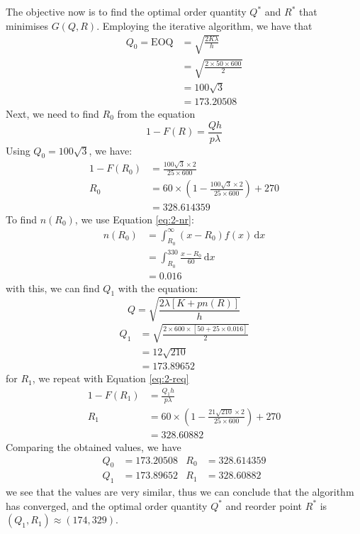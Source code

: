 \documentclass[12pt]{article}
\begin{document}
\noindent The objective now is to find the optimal order quantity $Q^{*}$ and $R^{*}$ that minimises $G(Q,R)$. Employing the iterative algorithm, we have that \begin{align*}
    Q_{0} = \text{EOQ} &= \sqrt{ \frac{2K\lambda}{h}} \\ 
    &= \sqrt{ \frac{2\times 50 \times 600}{2}} \\ 
    &= 100\sqrt{3} \\ 
    &= 173.20508
\end{align*} Next, we need to find $R_{0}$ from the equation \begin{equation}\label{eq:2-req}
    1- F(R) = \frac{Qh}{p\lambda} 
\end{equation} Using $Q_{0} = 100\sqrt{3}$, we have: \begin{align*}
    1-F(R_{0}) &= \frac{100\sqrt{3}\times 2}{25 \times 600} \\ 
    R_{0} &= 60 \times \left( 1-\frac{100\sqrt{3}\times 2}{25 \times 600}  \right) + 270 \\ 
    &= 328.614359
\end{align*} To find $n(R_{0})$, we use Equation \ref{eq:2-nr}: \begin{align*}
    n(R_{0}) &= \int_{R_{0}}^{\infty} (x - R_{0})f(x) \, \mathrm{d}x \\ 
    &= \int_{R_{0}}^{330} \frac{x-R_{0}}{60} \, \mathrm{d}x \\ 
    &= 0.016
\end{align*} with this, we can find $Q_{1}$ with the equation: \begin{equation}\label{eq:2-qeq}
    Q = \sqrt{ \frac{2 \lambda [K + pn(R)]}{h}}
\end{equation} \begin{align*}
    Q_{1} &= \sqrt{ \frac{2 \times 600 \times [50 + 25 \times 0.016]}{2}} \\ 
    &= 12\sqrt{210} \\ 
    &= 173.89652
\end{align*} for $R_{1}$, we repeat with Equation \ref{eq:2-req} \begin{align*}
    1 - F(R_{1}) &= \frac{Q_{1}h}{p\lambda} \\ 
    R_{1} &= 60 \times \left( 1- \frac{21\sqrt{210} \times 2}{25 \times 600} \right) + 270 \\ 
    &= 328.60882
\end{align*} Comparing the obtained values, we have \begin{align*}
    Q_{0} &= 173.20508 & R_{0} &= 328.614359 \\ 
    Q_{1} &= 173.89652 & R_{1} &= 328.60882
\end{align*} we see that the values are very similar, thus we can conclude that the algorithm has converged, and the optimal order quantity $Q^{*}$ and reorder point $R^{*}$ is $(Q_{1}, R_{1}) \approx (174, 329)$. 
\end{document}
